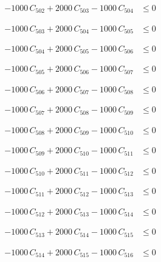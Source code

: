 \documentclass[a4paper,11pt]{article}
\begin{document}
\begin{align}
-1000\,C_{502} + 2000\,C_{503} - 1000\,C_{504} &\leq 0 \nonumber
\end{align}

\begin{align}
-1000\,C_{503} + 2000\,C_{504} - 1000\,C_{505} &\leq 0 \nonumber
\end{align}

\begin{align}
-1000\,C_{504} + 2000\,C_{505} - 1000\,C_{506} &\leq 0 \nonumber
\end{align}

\begin{align}
-1000\,C_{505} + 2000\,C_{506} - 1000\,C_{507} &\leq 0 \nonumber
\end{align}

\begin{align}
-1000\,C_{506} + 2000\,C_{507} - 1000\,C_{508} &\leq 0 \nonumber
\end{align}

\begin{align}
-1000\,C_{507} + 2000\,C_{508} - 1000\,C_{509} &\leq 0 \nonumber
\end{align}

\begin{align}
-1000\,C_{508} + 2000\,C_{509} - 1000\,C_{510} &\leq 0 \nonumber
\end{align}

\begin{align}
-1000\,C_{509} + 2000\,C_{510} - 1000\,C_{511} &\leq 0 \nonumber
\end{align}

\begin{align}
-1000\,C_{510} + 2000\,C_{511} - 1000\,C_{512} &\leq 0 \nonumber
\end{align}

\begin{align}
-1000\,C_{511} + 2000\,C_{512} - 1000\,C_{513} &\leq 0 \nonumber
\end{align}

\begin{align}
-1000\,C_{512} + 2000\,C_{513} - 1000\,C_{514} &\leq 0 \nonumber
\end{align}

\begin{align}
-1000\,C_{513} + 2000\,C_{514} - 1000\,C_{515} &\leq 0 \nonumber
\end{align}

\begin{align}
-1000\,C_{514} + 2000\,C_{515} - 1000\,C_{516} &\leq 0 \nonumber
\end{align}
\end{document}
